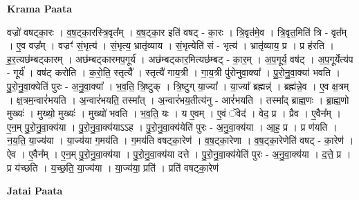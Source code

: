 \documentclass[17pt]{extarticle}
\begin{document}
\textbf{Krama Paata} \newline

वज्रो॑ वषट्का॒रः । व॒ष॒ट्का॒रस्त्रि॒वृत᳚म् । व॒ष॒ट्का॒र इति॑ वषट् - का॒रः । त्रि॒वृत॑मे॒व । त्रि॒वृत॒मिति॑ त्रि - वृत᳚म् । ए॒व वज्र᳚म् । वज्रꣳ॑ सं॒भृत्य॑ । सं॒भृत्य॒ भ्रातृ॑व्याय । सं॒भृत्येति॑ सं - भृत्य॑ । भ्रातृ॑व्याय॒ प्र । प्र ह॑रति । ह॒र॒त्यछ॑म्बट्कारम् । अछ॑म्बट्कारमप॒गूर्य॑ । अछ॑म्बट्कार॒मित्यछ॑म्बट् - का॒र॒म् । अ॒प॒गूर्य॒ वष॑ट् । अ॒प॒गूर्येत्य॑प - गूर्य॑ । वष॑ट् करोति । क॒रो॒ति॒ स्तृत्यै᳚ । स्तृत्यै॑ गाय॒त्री । गा॒य॒त्री पु॑रोनुवा॒क्या᳚ । पु॒रो॒नु॒वा॒क्या॑ भवति । पु॒रो॒नु॒वा॒क्येति॑ पुरः - अ॒नु॒वा॒क्या᳚ । भ॒व॒ति॒ त्रि॒ष्टुक् । त्रि॒ष्टुग् या॒ज्या᳚ । या॒ज्या᳚ ब्रह्मन्न्॑ । ब्रह्म॑न्ने॒व । ए॒व क्ष॒त्रम् । क्ष॒त्रम॒न्वारं॑भयति । अ॒न्वारं॑भयति॒ तस्मा᳚त् । अ॒न्वारं॑भय॒तीत्य॑नु - आरं॑भयति । तस्मा᳚द् ब्राह्म॒णः । ब्रा॒ह्म॒णो मुख्यः॑ । मुख्यो॒ मुख्यः॑ । मुख्यो॑ भवति । भ॒व॒ति॒ यः । य ए॒वम् । ए॒वं ॅवेद॑ । वेद॒ प्र । प्रैव । ए॒वैन᳚म् । ए॒न॒म् पु॒रो॒नु॒वा॒क्य॑या । पु॒रो॒नु॒वा॒क्य॑याऽऽह । पु॒रो॒नु॒वा॒क्य॑येति॑ पुरः - अ॒नु॒वा॒क्य॑या । आ॒ह॒ प्र । प्र ण॑यति । न॒य॒ति॒ या॒ज्य॑या । या॒ज्य॑या ग॒मय॑ति । ग॒मय॑ति वषट्का॒रेण॑ । व॒ष॒ट्का॒रेणा । व॒ष॒ट्का॒रेणेति॑ वषट् - का॒रेण॑ । ऐव । ए॒वैन᳚म् । ए॒न॒म् पु॒रो॒नु॒वा॒क्य॑या । पु॒रो॒नु॒वा॒क्य॑या दत्ते । पु॒रो॒नु॒वा॒क्य॑येति॑ पुरः - अ॒नु॒वा॒क्य॑या । द॒त्ते॒ प्र । प्र य॑च्छति । य॒च्छ॒ति॒ या॒ज्य॑या । या॒ज्य॑या॒ प्रति॑ । प्रति॑ वषट्का॒रेण॑ \newline

\textbf{Jatai Paata} \newline
\end{document}
